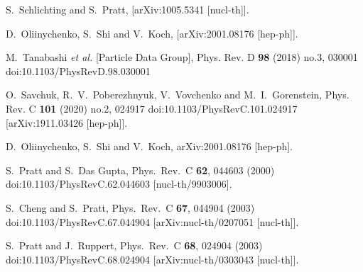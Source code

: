 \begin{thebibliography}{99}
S.~Schlichting and S.~Pratt,
[arXiv:1005.5341 [nucl-th]].

D.~Oliinychenko, S.~Shi and V.~Koch,
[arXiv:2001.08176 [hep-ph]].

M.~Tanabashi \textit{et al.} [Particle Data Group],
Phys. Rev. D \textbf{98} (2018) no.3, 030001
doi:10.1103/PhysRevD.98.030001

O.~Savchuk, R.~V.~Poberezhnyuk, V.~Vovchenko and M.~I.~Gorenstein,
Phys. Rev. C \textbf{101} (2020) no.2, 024917
doi:10.1103/PhysRevC.101.024917
[arXiv:1911.03426 [hep-ph]].

  D.~Oliinychenko, S.~Shi and V.~Koch,
  arXiv:2001.08176 [hep-ph].
  
  S.~Pratt and S.~Das Gupta,
  Phys.\ Rev.\ C {\bf 62}, 044603 (2000)
  doi:10.1103/PhysRevC.62.044603
  [nucl-th/9903006].

S.~Cheng and S.~Pratt,
Phys.\ Rev.\ C \textbf{67}, 044904 (2003)
doi:10.1103/PhysRevC.67.044904
[arXiv:nucl-th/0207051 [nucl-th]].

S.~Pratt and J.~Ruppert,
Phys.\ Rev.\ C \textbf{68}, 024904 (2003)
doi:10.1103/PhysRevC.68.024904
[arXiv:nucl-th/0303043 [nucl-th]].


\end{thebibliography}
